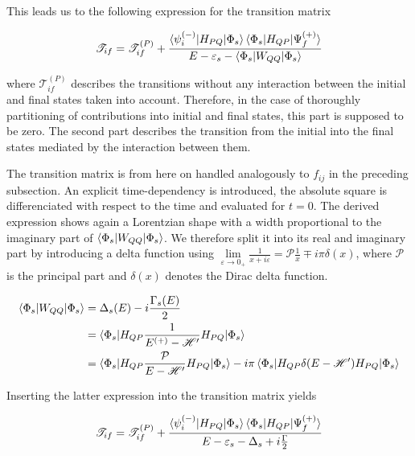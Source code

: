 This leads us to the following expression for the transition matrix

\begin{equation}
  \mathscr{T}_{if} = \mathscr{T}_{if}^{(P)} + 
                     \frac{\braket{\psi_i^{(-)}|H_{PQ}|\Phi_s}
                           \braket{\Phi_s|H_{QP}|\Psi_f^{(+)}}}
                          {E-\varepsilon_s - \braket{\Phi_s|W_{QQ}|\Phi_s}}
\end{equation}

where $\mathscr{T}_{if}^{(P)}$ describes the transitions without any interaction
between the initial and final states taken into account. Therefore, in the case
of thoroughly partitioning of contributions into initial and final states,
this part is supposed to be zero. The second part describes the transition
from the initial into the final states mediated by the interaction between them.

The transition matrix is from here on handled analogously to $f_{ij}$ in the preceding subsection.
An explicit time-dependency is introduced, the absolute square is differenciated
with respect to the time and evaluated for $t=0$.
The derived expression shows again a Lorentzian shape with a width proportional to
the imaginary part of $\braket{\Phi_s|W_{QQ}|\Phi_s}$. We therefore split it into
its real and imaginary part by introducing a delta function using 
$\lim\limits_{\varepsilon \to 0_+} \frac{1}{x+i\varepsilon} = \mathscr{P} \frac 1x \mp i\pi\delta(x)$,
where $\mathscr{P}$ is the principal part and $\delta(x)$ denotes the
Dirac delta function. \cite{Cohen_Tannoudji_3_2}

\begin{align}
  \braket{\Phi_s|W_{QQ}|\Phi_s} & = \Delta_s(E) - i \frac{\Gamma_s(E)}{2}\\
                                & = \braket{\Phi_s|H_{QP}
                                    \frac{1}{E^{(+)}  - \mathscr{H}'}H_{PQ}|\Phi_s}\\
                                & = \braket{\Phi_s|H_{QP}
                                    \frac{\mathcal{P}}{E - \mathscr{H}'}H_{PQ}|\Phi_s}
                                    - i\pi \braket{\Phi_s|H_{QP}\delta(E-\mathscr{H}')H_{PQ}
                                    |\Phi_s} 
\end{align}

Inserting the latter expression into the transition matrix yields

\begin{equation}
  \mathscr{T}_{if} = \mathscr{T}_{if}^{(P)} + 
                     \frac{\braket{\psi_i^{(-)}|H_{PQ}|\Phi_s}
                           \braket{\Phi_s|H_{QP}|\Psi_f^{(+)}}}
                          {E-\varepsilon_s - \Delta_s + i \frac{\Gamma}{2}}
\end{equation}

